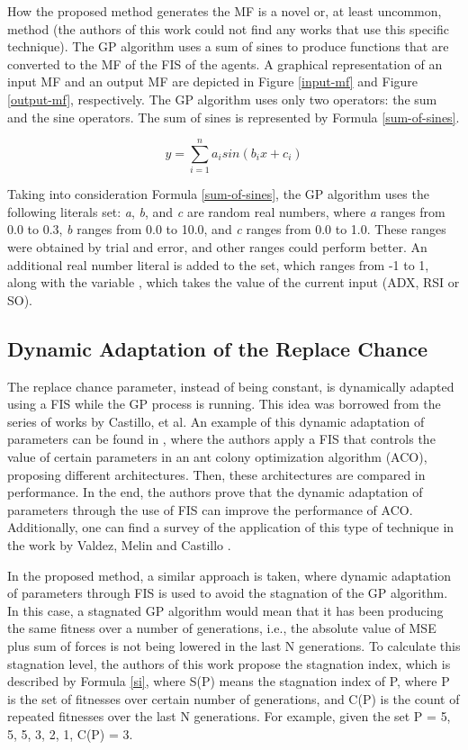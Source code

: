 \documentclass[a4paper,twoside]{article}
\begin{document}
How the proposed method generates the MF is a novel or, at least uncommon, method (the authors of this work could not find any works that use this specific technique). The GP algorithm uses a sum of sines to produce functions that are converted to the MF of the FIS of the agents. A graphical representation of an input MF and an output MF are depicted in Figure \ref{input-mf} and Figure \ref{output-mf}, respectively. The GP algorithm uses only two operators: the sum and the sine operators. The sum of sines is represented by Formula \ref{sum-of-sines}.

\begin{equation} \label{sum-of-sines}
  y = \sum_{i=1}^{n} a_{i} sin(b_{i}x + c_{i})
\end{equation}

Taking into consideration Formula \ref{sum-of-sines}, the GP algorithm uses the following literals set: \textit{a}, \textit{b}, and \textit{c} are random real numbers, where \textit{a} ranges from 0.0 to 0.3, \textit{b} ranges from 0.0 to 10.0, and \textit{c} ranges from 0.0 to 1.0. These ranges were obtained by trial and error, and other ranges could perform better. An additional real number literal is added to the set, which ranges from -1 to 1, along with the variable , which takes the value of the current input (ADX, RSI or SO).

\subsection{Dynamic Adaptation of the Replace Chance}
\label{dynamic-adaptation-of-the-replace-chance}

The replace chance parameter, instead of being constant, is dynamically adapted using a FIS while the GP process is running. This idea was borrowed from the series of works by Castillo, et al. An example of this dynamic adaptation of parameters can be found in \cite{castillo2015new}, where the authors apply a FIS that controls the value of certain parameters in an ant colony optimization algorithm (ACO), proposing different architectures. Then, these architectures are compared in performance. In the end, the authors prove that the dynamic adaptation of parameters through the use of FIS can improve the performance of ACO. Additionally, one can find a survey of the application of this type of technique in the work by Valdez, Melin and Castillo \cite{valdez2014survey}.

In the proposed method, a similar approach is taken, where dynamic adaptation of parameters through FIS is used to avoid the stagnation of the GP algorithm. In this case, a stagnated GP algorithm would mean that it has been producing the same fitness over a number of generations, i.e., the absolute value of MSE plus sum of forces is not being lowered in the last N generations. To calculate this stagnation level, the authors of this work propose the stagnation index, which is described by Formula \ref{si}, where S(P) means the stagnation index of P, where P is the set of fitnesses over certain number of generations, and C(P) is the count of repeated fitnesses over the last N generations. For example, given the set P = {5, 5, 5, 3, 2, 1}, C(P) = 3.
\end{document}
